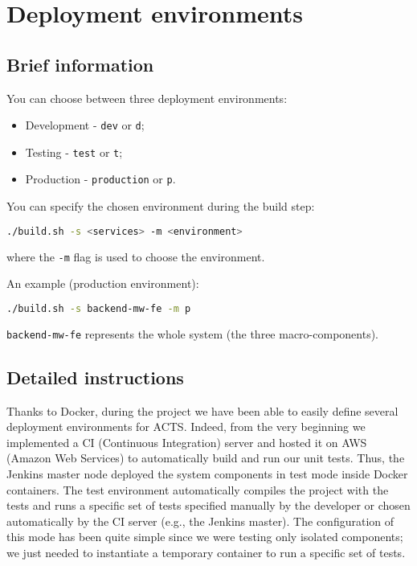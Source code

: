 
\section{Deployment environments}

\subsection{Brief information}

You can choose between three deployment environments:

\begin{itemize}
\item Development - \texttt{dev} or \texttt{d};
\item Testing - \texttt{test} or \texttt{t};
\item Production - \texttt{production} or \texttt{p}.
\end{itemize}

You can specify the chosen environment during the build step:

\begin{lstlisting}[language=bash]
./build.sh -s <services> -m <environment>
\end{lstlisting}

where the \texttt{-m} flag is used to choose the environment.


An example (production environment):

\begin{lstlisting}[language=bash]
./build.sh -s backend-mw-fe -m p
\end{lstlisting}

\texttt{backend-mw-fe} represents the whole system (the three macro-components).


\subsection{Detailed instructions}
Thanks to Docker, during the project we have been able to easily define several
deployment environments for ACTS. Indeed, from the very beginning we implemented a CI (Continuous Integration) server and hosted it
on AWS (Amazon Web Services) to automatically build and run our unit tests.
Thus, the Jenkins master node deployed the
system components in test mode inside Docker containers.
The test environment automatically compiles the project with the tests and
runs a specific set of tests specified manually by the developer or chosen automatically by
the CI server (e.g., the Jenkins master). The configuration of this mode has been quite simple
since we were testing only isolated components;
we just needed to instantiate a temporary
container to run a specific set of tests.


